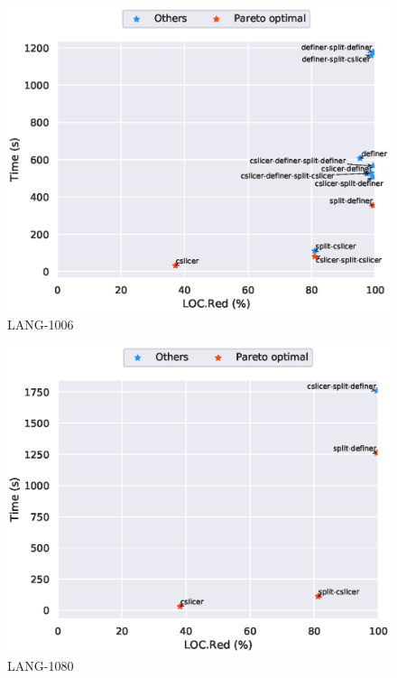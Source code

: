 \begin{figure}
\includegraphics[scale=0.7]{plots/pareto/LANG-1006-pareto}
\caption{LANG-1006}
\end{figure}
\begin{figure}
\includegraphics[scale=0.7]{plots/pareto/LANG-1080-pareto}
\caption{LANG-1080}
\end{figure}

